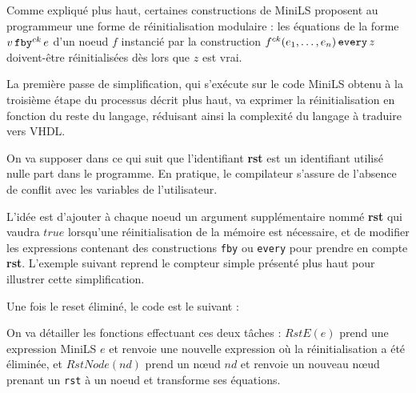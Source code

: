 \documentclass[a4paper]{article}
\newcommand{\mybox}[1]{\mbox{\tt{#1}}}
\newcommand{\Fby}[2]{#1 \, \mybox{fby}^{ck} \, #2}
\newcommand{\Every}[4]{#1^{ck}(#2,\dots,#3) \, \mybox{every} \, #4}
\begin{document}
Comme expliqu\'e plus haut, certaines constructions de MiniLS proposent au
programmeur une forme de r\'einitialisation modulaire : les \'equations de la
forme $\Fby{v}{e}$ d'un noeud $f$ instanci\'e par la construction
$\Every{f}{e_1}{e_n}{z}$ doivent-\^etre r\'einitialis\'ees d\`es lors que $z$
est vrai.

La premi\`ere passe de simplification, qui s'ex\'ecute sur le code MiniLS obtenu
\`a la troisi\`eme \'etape du processus d\'ecrit plus haut, va exprimer la
r\'einitialisation en fonction du reste du langage, r\'eduisant ainsi la complexit\'e
du langage \`a traduire vers VHDL.

On va supposer dans ce qui suit que l'identifiant \textbf{rst} est un
identifiant utilis\'e nulle part dans le programme. En pratique, le compilateur
s'assure de l'absence de conflit avec les variables de l'utilisateur.

L'id\'ee est d'ajouter \`a chaque noeud un argument suppl\'ementaire nomm\'e
\textbf{rst} qui vaudra $true$ lorsqu'une r\'einitialisation de la m\'emoire est
n\'ecessaire, et de modifier les expressions contenant des constructions
\texttt{fby} ou \texttt{every} pour prendre en compte \textbf{rst}. L'exemple
suivant reprend le compteur simple pr\'esent\'e plus haut pour illustrer cette
simplification.



Une fois le reset \'elimin\'e, le code est le suivant :



On va d\'etailler les fonctions effectuant ces deux t\^aches : $RstE(e)$ prend une
expression MiniLS $e$ et renvoie une nouvelle expression o\`u la r\'einitialisation
a \'et\'e \'elimin\'ee, et $RstNode(nd)$ prend un nœud $nd$ et renvoie un nouveau nœud
prenant un \texttt{rst} \`a un noeud et transforme ses \'equations.

\newcommand{\re}[1]{RstE(#1)}
\newcommand{\rstn}[1]{RstNode(#1)}
\end{document}
